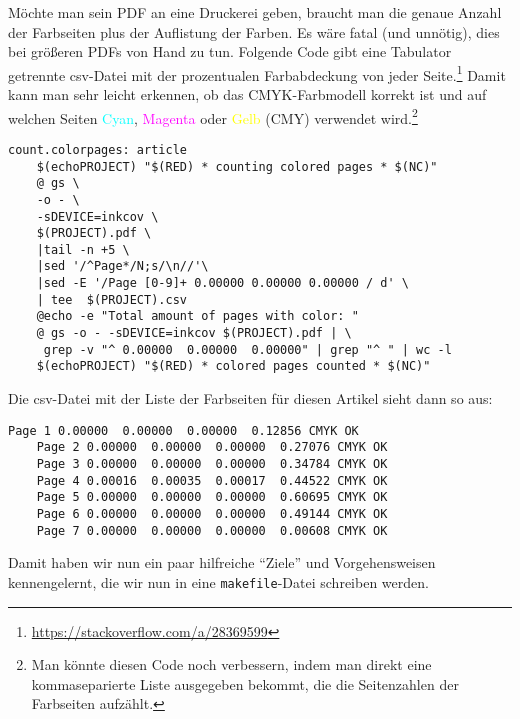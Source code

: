 \documentclass[ngerman]{dtk}
\begin{document}
Möchte man sein PDF an eine Druckerei geben,
braucht man die genaue Anzahl der Farbseiten plus der Auflistung der Farben.
Es wäre fatal (und unnötig), dies bei größeren PDFs von Hand zu tun.
Folgende Code gibt eine Tabulator getrennte csv-Datei
mit der prozentualen Farbabdeckung von jeder Seite.\footnote{\url{https://stackoverflow.com/a/28369599}}
Damit kann man sehr leicht erkennen,
ob das CMYK-Farbmodell korrekt ist und auf welchen Seiten
\textcolor{cyan}{Cyan},
\textcolor{magenta}{Magenta} oder
\textcolor{yellow}{Gelb} (CMY) verwendet wird.\footnote{Man könnte diesen Code noch verbessern,
indem man direkt eine kommaseparierte Liste ausgegeben bekommt,
die die Seitenzahlen der Farbseiten aufzählt.}
\begin{lstlisting}[style=number]
count.colorpages: article
	$(echoPROJECT) "$(RED) * counting colored pages * $(NC)"
	@ gs \
	-o - \
	-sDEVICE=inkcov \
	$(PROJECT).pdf \
	|tail -n +5 \
	|sed '/^Page*/N;s/\n//'\
	|sed -E '/Page [0-9]+ 0.00000 0.00000 0.00000 / d' \
	| tee  $(PROJECT).csv
	@echo -e "Total amount of pages with color: "
	@ gs -o - -sDEVICE=inkcov $(PROJECT).pdf | \
	 grep -v "^ 0.00000  0.00000  0.00000" | grep "^ " | wc -l
	$(echoPROJECT) "$(RED) * colored pages counted * $(NC)"
\end{lstlisting}
Die csv-Datei mit der Liste der Farbseiten für diesen Artikel sieht dann so aus:
\begin{lstlisting}[style=noNumber]
    Page 1 0.00000  0.00000  0.00000  0.12856 CMYK OK
    Page 2 0.00000  0.00000  0.00000  0.27076 CMYK OK
    Page 3 0.00000  0.00000  0.00000  0.34784 CMYK OK
    Page 4 0.00016  0.00035  0.00017  0.44522 CMYK OK
    Page 5 0.00000  0.00000  0.00000  0.60695 CMYK OK
    Page 6 0.00000  0.00000  0.00000  0.49144 CMYK OK
    Page 7 0.00000  0.00000  0.00000  0.00608 CMYK OK
\end{lstlisting}

Damit haben wir nun ein paar hilfreiche \enquote{Ziele} und
Vorgehensweisen kennengelernt,
die wir nun in eine \texttt{makefile}-Datei schreiben werden.
\end{document}
